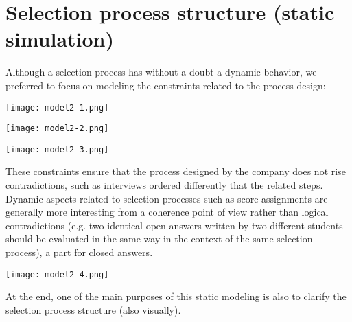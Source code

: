 	\section{Selection process structure (static simulation)}
		Although a selection process has without a doubt a dynamic behavior, we preferred to focus on modeling the constraints related to the process design:
		\begin{center}
			\texttt{[image: model2-1.png]}
		\end{center}
		\begin{center}
			\texttt{[image: model2-2.png]}
		\end{center}
		\begin{center}
			\texttt{[image: model2-3.png]}
		\end{center}
		These constraints ensure that the process designed by the company does not rise contradictions, such as interviews ordered differently that the related steps.
		Dynamic aspects related to selection processes such as score assignments are generally more interesting from a coherence point of view rather than logical contradictions (e.g. two identical open answers written by two different students should be evaluated in the same way in the context of the same selection process), a part for closed answers.
		\begin{center}
			\texttt{[image: model2-4.png]}
		\end{center}
		At the end, one of the main purposes of this static modeling is also to clarify the selection process structure (also visually).
